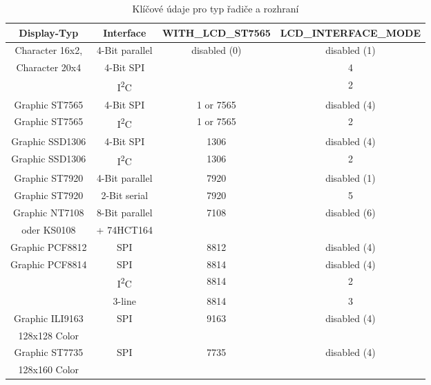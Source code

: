 \begin{description}
\begin{table}[H]
  \begin{center}
    \begin{tabular}{| c | c | c | c|}
    \hline
 Display-Typ        &  Interface     & WITH\_LCD\_ST7565 &  LCD\_INTERFACE\_MODE \\
    \hline
    \hline
  Character 16x2,   & 4-Bit parallel &  disabled (0)      & disabled (1) \\
  Character 20x4    &  4-Bit SPI     &                    &    4   \\
                  & I\textsuperscript{2}C &               &    2   \\
    \hline
  Graphic ST7565    & 4-Bit SPI      & 1 or 7565          & disabled (4) \\
    \hline
  Graphic ST7565  & I\textsuperscript{2}C & 1 or 7565     &   2 \\
    \hline
  Graphic SSD1306   & 4-Bit SPI      & 1306               & disabled (4) \\
    \hline
  Graphic SSD1306 & I\textsuperscript{2}C & 1306          &   2 \\
    \hline
  Graphic ST7920    & 4-Bit parallel  & 7920              & disabled (1) \\
    \hline
  Graphic ST7920    & 2-Bit serial    & 7920               &  5 \\
    \hline
  Graphic NT7108    & 8-Bit parallel  & 7108              & disabled (6) \\
  oder KS0108       &    + 74HCT164   &                   &      \\
    \hline
  Graphic PCF8812   & SPI             & 8812              & disabled (4) \\
    \hline
  Graphic PCF8814   & SPI             & 8814              & disabled (4) \\
                  & I\textsuperscript{2}C & 8814          &   2 \\
                    & 3-line          & 8814              &   3 \\
    \hline
  Graphic ILI9163   & SPI             & 9163              & disabled (4) \\
  128x128 Color     &                 &                   &              \\
    \hline
  Graphic ST7735    & SPI             & 7735              & disabled (4) \\
  128x160 Color     &                 &                   &              \\
    \hline
    \end{tabular}
  \end{center}
  \caption{Klíčové údaje pro typ řadiče a rozhraní}
  \label{tab:cod-display}
\end{table}


\end{description}
